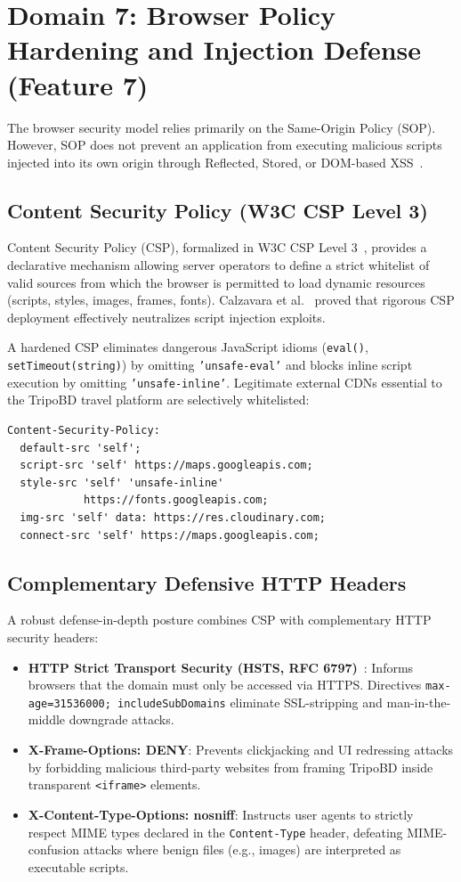 \documentclass[10pt,twocolumn,a4paper]{article}
\begin{document}
\section{Domain 7: Browser Policy Hardening and Injection Defense (Feature 7)}
The browser security model relies primarily on the Same-Origin Policy (SOP). However, SOP does not prevent an application from executing malicious scripts injected into its own origin through Reflected, Stored, or DOM-based XSS~\cite{lekies2013domxss}.

\subsection{Content Security Policy (W3C CSP Level 3)}
Content Security Policy (CSP), formalized in W3C CSP Level 3~\cite{w3c_csp3}, provides a declarative mechanism allowing server operators to define a strict whitelist of valid sources from which the browser is permitted to load dynamic resources (scripts, styles, images, frames, fonts). Calzavara et al.~\cite{calzavara2020csp} proved that rigorous CSP deployment effectively neutralizes script injection exploits.

A hardened CSP eliminates dangerous JavaScript idioms (\texttt{eval()}, \texttt{setTimeout(string)}) by omitting \texttt{'unsafe-eval'} and blocks inline script execution by omitting \texttt{'unsafe-inline'}. Legitimate external CDNs essential to the TripoBD travel platform are selectively whitelisted:
\begin{verbatim}
Content-Security-Policy: 
  default-src 'self'; 
  script-src 'self' https://maps.googleapis.com; 
  style-src 'self' 'unsafe-inline' 
            https://fonts.googleapis.com; 
  img-src 'self' data: https://res.cloudinary.com; 
  connect-src 'self' https://maps.googleapis.com;
\end{verbatim}

\subsection{Complementary Defensive HTTP Headers}
A robust defense-in-depth posture combines CSP with complementary HTTP security headers:
\begin{itemize}[leftmargin=*]
    \item \textbf{HTTP Strict Transport Security (HSTS, RFC 6797)}~\cite{hodges2012hsts}: Informs browsers that the domain must only be accessed via HTTPS. Directives \texttt{max-age=31536000; includeSubDomains} eliminate SSL-stripping and man-in-the-middle downgrade attacks.
    \item \textbf{X-Frame-Options: DENY}: Prevents clickjacking and UI redressing attacks by forbidding malicious third-party websites from framing TripoBD inside transparent \texttt{<iframe>} elements.
    \item \textbf{X-Content-Type-Options: nosniff}: Instructs user agents to strictly respect MIME types declared in the \texttt{Content-Type} header, defeating MIME-confusion attacks where benign files (e.g., images) are interpreted as executable scripts.
\end{itemize}
\end{document}
